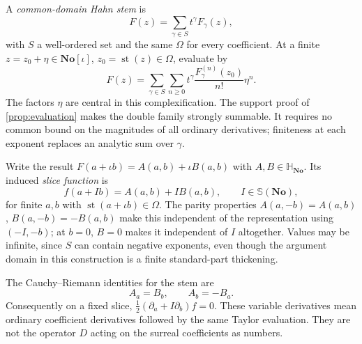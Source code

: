 \documentclass[11pt,letterpaper]{article}
\numberwithin{equation}{section}
\theoremstyle{definition}
\theoremstyle{remark}
\newcommand{\No}{\mathbf{No}}
\newcommand{\SQ}{\mathbb H_{\No}}
\newcommand{\st}{\operatorname{st}}
\begin{document}
A \emph{common-domain Hahn stem} is
\begin{equation}\label{eq:hahnstem}
 F(z)=\sum_{\gamma\in S}t^\gamma F_\gamma(z),
\end{equation}
with $S$ a well-ordered set and the same $\Omega$ for every coefficient. At a finite
$z=z_0+\eta\in\No[\iota]$, $z_0=\st(z)\in\Omega$, evaluate by
\begin{equation}\label{eq:stemeval}
 F(z)=\sum_{\gamma\in S}\sum_{n\ge0}
 t^\gamma\frac{F_\gamma^{(n)}(z_0)}{n!}\eta^n.
\end{equation}
The factors $\eta$ are central in this complexification. The support proof of
\cref{prop:evaluation} makes the double family strongly summable. It requires no common
bound on the magnitudes of all ordinary derivatives; finiteness at each exponent replaces
an analytic sum over $\gamma$.

Write the result $F(a+\iota b)=A(a,b)+\iota B(a,b)$ with $A,B\in\SQ$. Its induced
\emph{slice function} is
\begin{equation}\label{eq:slicefunction}
 f(a+Ib)=A(a,b)+I B(a,b),\qquad I\in\mathbb S(\No),
\end{equation}
for finite $a,b$ with $\st(a+\iota b)\in\Omega$. The parity properties
$A(a,-b)=A(a,b)$, $B(a,-b)=-B(a,b)$ make this independent of the representation using
$(-I,-b)$; at $b=0$, $B=0$ makes it independent of $I$ altogether. Values may be infinite,
since $S$ can contain negative exponents, even though the argument domain in this
construction is a finite standard-part thickening.

The Cauchy--Riemann identities for the stem are
\begin{equation}\label{eq:CR}
 A_a=B_b,\qquad A_b=-B_a.
\end{equation}
Consequently on a fixed slice,
$\tfrac12(\partial_a+I\partial_b)f=0$. These variable derivatives mean ordinary coefficient
derivatives followed by the same Taylor evaluation. They are not the operator $D$ acting
on the surreal coefficients as numbers.
\end{document}
